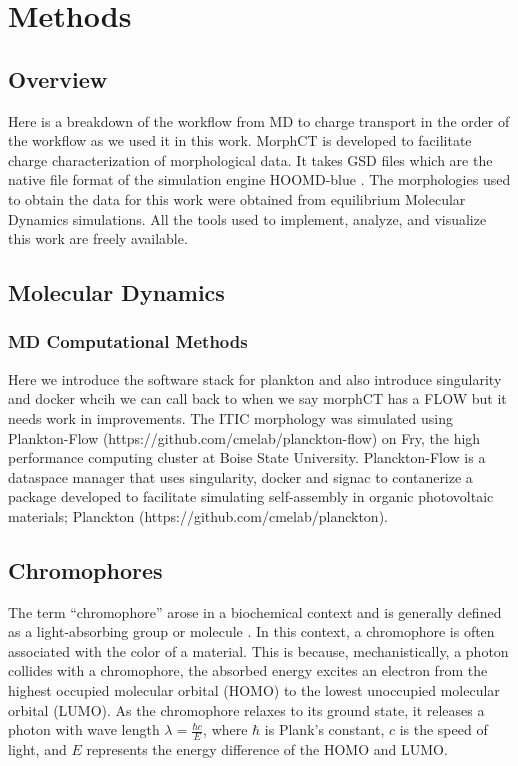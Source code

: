 \chapter{Methods}
\label{chap:methods}
\section{Overview}
Here is a breakdown of the workflow from MD to charge transport in the order of the workflow as we used it in
this work. 
MorphCT is developed to facilitate charge characterization of morphological data. It takes GSD files which are
the native file format of the simulation engine HOOMD-blue \cite{Anderson2020a}. The morphologies used to
obtain the data for this work were obtained from equilibrium Molecular Dynamics simulations. 
All the tools used to implement, analyze, and
visualize this work are freely available. 

\section{Molecular Dynamics}

    \subsection{MD Computational Methods}
Here we introduce the software stack for plankton and also introduce singularity and docker whcih we can call
back to when we say morphCT has a FLOW but it needs work in improvements.
The ITIC morphology was simulated using Plankton-Flow (https://github.com/cmelab/planckton-flow) on Fry, the high performance computing cluster at Boise State University. Planckton-Flow is a dataspace manager that uses
singularity, docker and signac to contanerize a package developed to facilitate simulating self-assembly in
organic photovoltaic materials; Planckton (https://github.com/cmelab/planckton).

\section{Chromophores}

The term ``chromophore'' arose in a biochemical context and is generally defined
as a light-absorbing group or molecule \cite{biochemistry}.
In this context, a chromophore is often associated with the color of a material.
This is because, mechanistically, a photon collides with a chromophore, the absorbed energy
excites an electron from the highest occupied molecular orbital (HOMO) to the
lowest unoccupied molecular orbital (LUMO). As the chromophore relaxes to its
ground state, it releases a photon with wave length $\lambda = \frac{\hbar c}{E}$,
where $\hbar$ is Plank's constant, $c$ is the speed of light, and $E$ represents the
energy difference of the HOMO and LUMO. 

